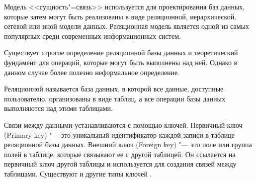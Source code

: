 Модель <<сущность"=связь>> используется для проектирования баз данных, которые затем могут быть реализованы в виде реляционной, иерархической, сетевой или иной модели данных. Реляционная модель является одной из самых популярных среди современных информационных систем. 

Существует строгое определение реляционной базы данных и теоретический фундамент для операций, которые
могут быть выполнены над ней. Однако в данном случае более полезно неформальное определение.

Реляционной называется база данных, в которой все данные, доступные пользователю, организованы в виде таблиц, а все операции базы данных выполняются над этими таблицами. 

Связи между данными устанавливаются с помощью ключей. Первичный ключ (Primary key) "--- это уникальный идентификатор каждой записи в таблице реляционной базы данных. Внешний ключ (Foreign key) "--- это поле или группа полей в таблице, которые связывают ее с другой таблицей. Он ссылается на первичный ключ другой таблицы и используется для создания связей между таблицами. Существуют и другие типы ключей \cite{10}.